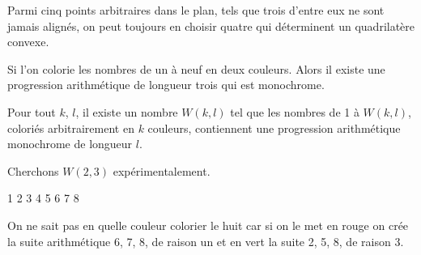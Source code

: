 \begin{mytheo} 
Parmi cinq points arbitraires dans le plan, tels que trois d'entre eux ne sont  jamais alignés, on peut toujours en choisir quatre qui déterminent un quadrilatère convexe.
\end{mytheo}

\begin{mytheo}
Si l'on colorie les nombres de un à neuf en deux couleurs.  Alors il existe une progression arithmétique de longueur trois qui est monochrome.
\end{mytheo}
     
\begin{mytheo} 
Pour tout $k$, $l$, il existe un nombre $W(k,l)$ tel que les nombres de 1 à $W(k,l)$, coloriés arbitrairement en $k$ couleurs, contiennent une progression arithmétique monochrome de longueur $l$.
\end{mytheo}

\begin{myexem} Cherchons $W(2,3)$ expérimentalement.

\color{green}1 \color{green}2 \color{red}3 \color{green}4 \color{green}5  \color{red}6 \color{red}7 \color{black}8

On ne sait pas en quelle couleur colorier le huit car si on le met en rouge on crée la suite arithmétique 6, 7, 8, de raison un et en vert la suite 2, 5, 8, de raison 3.
\end{myexem}
